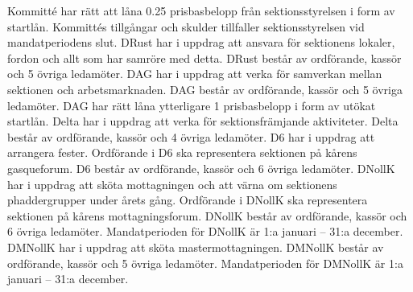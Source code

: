\documentclass[a4paper]{dteklag}
\newcommand{\prisbasbelopp}[1]{
    #1 prisbasbelopp
    \ifdef{\nuvarandeprisbasbelopp}{
        \marginpar{
            \small{ \textbf{\roundandprint{\xintiexpr#1 * \nuvarandeprisbasbelopp\relax}kr}}
        }
    }{}
}
\begin{document}
\para Kommitté har rätt att låna \prisbasbelopp{0.25} från sektionsstyrelsen i form av startlån.
\para Kommittés tillgångar och skulder tillfaller sektionsstyrelsen vid mandatperiodens slut.
\para[DRust] DRust har i uppdrag att ansvara för sektionens lokaler, fordon och allt som har samröre med detta.
\para DRust består av ordförande, kassör och 5 övriga ledamöter.
\para[DAG] DAG har i uppdrag att verka för samverkan mellan sektionen och arbetsmarknaden.
\para DAG består av ordförande, kassör och 5 övriga ledamöter.
\para DAG har rätt låna ytterligare \prisbasbelopp{1} i form av utökat startlån.
\para[Delta] Delta har i uppdrag att verka för sektionsfrämjande aktiviteter.
\para Delta består av ordförande, kassör och 4 övriga ledamöter.
\para[D6] D6 har i uppdrag att arrangera fester.
\para Ordförande i D6 ska representera sektionen på kårens gasqueforum.
\para D6 består av ordförande, kassör och 6 övriga ledamöter.
\para[DNollK] DNollK har i uppdrag att sköta mottagningen och att värna om sektionens phaddergrupper under årets gång.
\para Ordförande i DNollK ska representera sektionen på kårens mottagningsforum.
\para DNollK består av ordförande, kassör och 6 övriga ledamöter.
\para Mandatperioden för DNollK är 1:a januari – 31:a december.
\para[DMNollK] DMNollK har i uppdrag att sköta mastermottagningen.
\para DMNollK består av ordförande, kassör och 5 övriga ledamöter.
\para Mandatperioden för DMNollK är 1:a januari – 31:a december.
\end{document}
